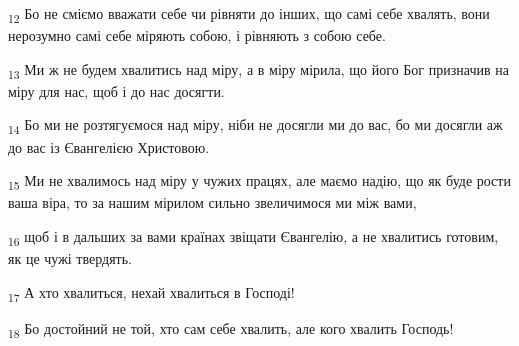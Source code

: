 \begin{tcolorbox}
\textsubscript{12} Бо не сміємо вважати себе чи рівняти до інших, що самі себе хвалять, вони нерозумно самі себе міряють собою, і рівняють з собою себе.
\end{tcolorbox}
\begin{tcolorbox}
\textsubscript{13} Ми ж не будем хвалитись над міру, а в міру мірила, що його Бог призначив на міру для нас, щоб і до нас досягти.
\end{tcolorbox}
\begin{tcolorbox}
\textsubscript{14} Бо ми не розтягуємося над міру, ніби не досягли ми до вас, бо ми досягли аж до вас із Євангелією Христовою.
\end{tcolorbox}
\begin{tcolorbox}
\textsubscript{15} Ми не хвалимось над міру у чужих працях, але маємо надію, що як буде рости ваша віра, то за нашим мірилом сильно звеличимося ми між вами,
\end{tcolorbox}
\begin{tcolorbox}
\textsubscript{16} щоб і в дальших за вами країнах звіщати Євангелію, а не хвалитись готовим, як це чужі твердять.
\end{tcolorbox}
\begin{tcolorbox}
\textsubscript{17} А хто хвалиться, нехай хвалиться в Господі!
\end{tcolorbox}
\begin{tcolorbox}
\textsubscript{18} Бо достойний не той, хто сам себе хвалить, але кого хвалить Господь!
\end{tcolorbox}
